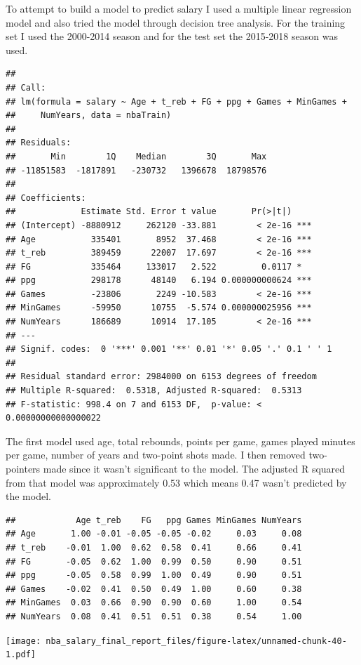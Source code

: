 \documentclass[]{article}
\begin{document}
To attempt to build a model to predict salary I used a multiple linear
regression model and also tried the model through decision tree
analysis. For the training set I used the 2000-2014 season and for the
test set the 2015-2018 season was used.

\begin{verbatim}
## 
## Call:
## lm(formula = salary ~ Age + t_reb + FG + ppg + Games + MinGames + 
##     NumYears, data = nbaTrain)
## 
## Residuals:
##       Min        1Q    Median        3Q       Max 
## -11851583  -1817891   -230732   1396678  18798576 
## 
## Coefficients:
##             Estimate Std. Error t value       Pr(>|t|)    
## (Intercept) -8880912     262120 -33.881        < 2e-16 ***
## Age           335401       8952  37.468        < 2e-16 ***
## t_reb         389459      22007  17.697        < 2e-16 ***
## FG            335464     133017   2.522         0.0117 *  
## ppg           298178      48140   6.194 0.000000000624 ***
## Games         -23806       2249 -10.583        < 2e-16 ***
## MinGames      -59950      10755  -5.574 0.000000025956 ***
## NumYears      186689      10914  17.105        < 2e-16 ***
## ---
## Signif. codes:  0 '***' 0.001 '**' 0.01 '*' 0.05 '.' 0.1 ' ' 1
## 
## Residual standard error: 2984000 on 6153 degrees of freedom
## Multiple R-squared:  0.5318, Adjusted R-squared:  0.5313 
## F-statistic: 998.4 on 7 and 6153 DF,  p-value: < 0.00000000000000022
\end{verbatim}

The first model used age, total rebounds, points per game, games played
minutes per game, number of years and two-point shots made. I then
removed two-pointers made since it wasn't significant to the model. The
adjusted R squared from that model was approximately 0.53 which means
0.47 wasn't predicted by the model.

\begin{verbatim}
##            Age t_reb    FG   ppg Games MinGames NumYears
## Age       1.00 -0.01 -0.05 -0.05 -0.02     0.03     0.08
## t_reb    -0.01  1.00  0.62  0.58  0.41     0.66     0.41
## FG       -0.05  0.62  1.00  0.99  0.50     0.90     0.51
## ppg      -0.05  0.58  0.99  1.00  0.49     0.90     0.51
## Games    -0.02  0.41  0.50  0.49  1.00     0.60     0.38
## MinGames  0.03  0.66  0.90  0.90  0.60     1.00     0.54
## NumYears  0.08  0.41  0.51  0.51  0.38     0.54     1.00
\end{verbatim}

\texttt{[image: nba\_salary\_final\_report\_files/figure-latex/unnamed-chunk-40-1.pdf]}
\end{document}
